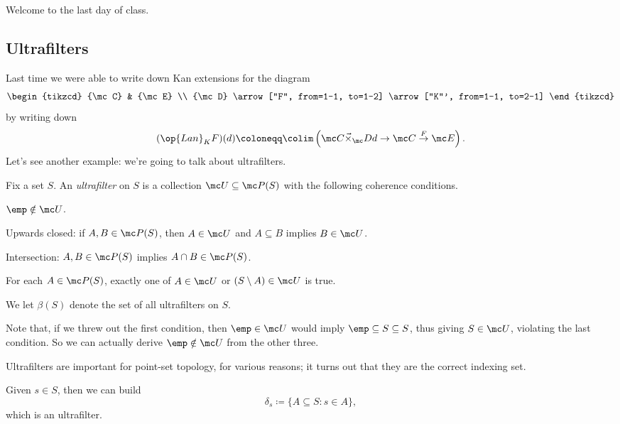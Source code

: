 
Welcome to the last day of class.

\subsection{Ultrafilters}
Last time we were able to write down Kan extensions for the diagram
\[\begin{tikzcd}
	{\mc C} & {\mc E} \\
	{\mc D}
	\arrow["F", from=1-1, to=1-2]
	\arrow["K"', from=1-1, to=2-1]
\end{tikzcd}\]
by writing down
\[(\op{Lan}_KF)(d)\coloneqq\colim\left(\mc C\vec\times_\mc Dd\to\mc C\stackrel F\to\mc E\right).\]
Let's see another example: we're going to talk about ultrafilters.
\begin{definition}[Ultrafilter]
	Fix a set $S$. An \textit{ultrafilter} on $S$ is a collection $\mc U\subseteq\mc P(S)$ with the following coherence conditions.
	\begin{listalph}
		\item $\emp\notin\mc U$.
		\item Upwards closed: if $A,B\in\mc P(S)$, then $A\in\mc U$ and $A\subseteq B$ implies $B\in\mc U$.
		\item Intersection: $A,B\in\mc P(S)$ implies $A\cap B\in\mc P(S)$.
		\item For each $A\in\mc P(S)$, exactly one of $A\in\mc U$ or $(S\setminus A)\in\mc U$ is true.
	\end{listalph}
	We let $\beta(S)$ denote the set of all ultrafilters on $S$.
\end{definition}
\begin{remark}
	Note that, if we threw out the first condition, then $\emp\in\mc U$ would imply $\emp\subseteq S\subseteq S$, thus giving $S\in\mc U$, violating the last condition. So we can actually derive $\emp\notin\mc U$ from the other three.
\end{remark}
Ultrafilters are important for point-set topology, for various reasons; it turns out that they are the correct indexing set.
\begin{example}
	Given $s\in S$, then we can build
	\[\delta_s\coloneqq\{A\subseteq S:s\in A\},\]
	which is an ultrafilter.
\end{example}
